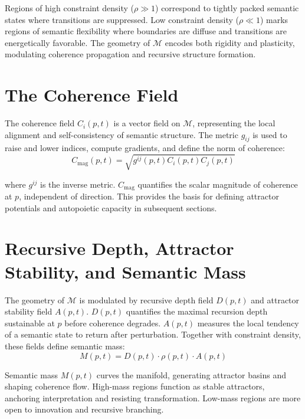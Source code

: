 Regions of high constraint density (\(\rho \gg 1\)) correspond to tightly packed semantic states where transitions are suppressed. Low constraint density (\(\rho \ll 1\)) marks regions of semantic flexibility where boundaries are diffuse and transitions are energetically favorable. The geometry of \(\mathcal{M}\) encodes both rigidity and plasticity, modulating coherence propagation and recursive structure formation.

\section{The Coherence Field}

The coherence field \(C_i(p, t)\) is a vector field on \(\mathcal{M}\), representing the local alignment and self-consistency of semantic structure. The metric \(g_{ij}\) is used to raise and lower indices, compute gradients, and define the norm of coherence:
\begin{equation}
C_{\mathrm{mag}}(p, t) = \sqrt{g^{ij}(p, t) C_i(p, t) C_j(p, t)}
\end{equation}

where \(g^{ij}\) is the inverse metric. \(C_{\mathrm{mag}}\) quantifies the scalar magnitude of coherence at \(p\), independent of direction. This provides the basis for defining attractor potentials and autopoietic capacity in subsequent sections.

\section{Recursive Depth, Attractor Stability, and Semantic Mass}

The geometry of \(\mathcal{M}\) is modulated by recursive depth field \(D(p, t)\) and attractor stability field \(A(p, t)\). \(D(p, t)\) quantifies the maximal recursion depth sustainable at \(p\) before coherence degrades. \(A(p, t)\) measures the local tendency of a semantic state to return after perturbation. Together with constraint density, these fields define semantic mass:
\begin{equation}
M(p, t) = D(p, t) \cdot \rho(p, t) \cdot A(p, t)
\end{equation}

Semantic mass \(M(p, t)\) curves the manifold, generating attractor basins and shaping coherence flow. High-mass regions function as stable attractors, anchoring interpretation and resisting transformation. Low-mass regions are more open to innovation and recursive branching. 